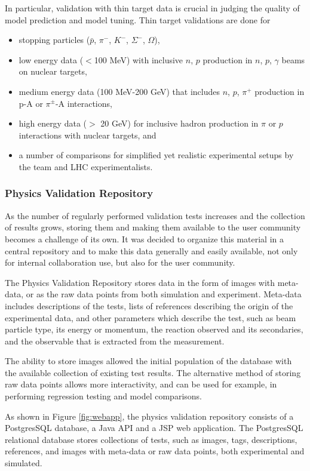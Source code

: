 In particular, validation with thin target data is crucial in judging the 
quality of model prediction and model tuning.  Thin target validations are done
for
\begin{itemize}
\item stopping particles ($\bar{p}$, $\pi^-$, $K^{-}$, $\Sigma^{-}$, $\Omega$),
\item low energy data ($<$100 MeV) with inclusive $n$, $p$ production in $n$,
      $p$, $\gamma$ beams on nuclear targets,
\item medium energy data (100 MeV-200 GeV) that includes $n$, $p$, $\pi^+$ 
      production in p-A or $\pi^{\pm}$-A interactions,
\item high energy data ($>$ 20 GeV) for inclusive hadron production in $\pi$ or
      $p$ interactions with nuclear targets, and
\item a number of comparisons for simplified yet realistic experimental setups
      by the \Gfour{} team and LHC experimentalists.
\end{itemize}

\subsubsection{Physics Validation Repository}
As the number of regularly performed validation tests increases and the 
collection of results grows, storing them and making them available to the 
user community becomes a challenge of its own.  It was decided to organize
this material in a central repository and to make this data generally and easily
available, not only for internal collaboration use, but also for the user 
community.

The Physics Validation Repository stores data in the form of images with 
meta-data, or as the raw data points from both simulation and experiment.
Meta-data includes descriptions of the tests, lists of references describing the
origin of the experimental data, and other parameters which describe the test,
such as beam particle type, its energy or momentum, the reaction observed and 
its secondaries, and the observable that is extracted from the measurement. 

The ability to store images allowed the initial population of the database with
the available collection of existing test results.  The alternative method of 
storing raw data points allows more interactivity, and can be used for example,
in performing regression testing and model comparisons.

As shown in Figure \ref{fig:webapp}, the physics validation repository consists
of a PostgresSQL database, a Java API and a JSP web application. 
The PostgresSQL \cite{PVT:postgres} relational database stores collections of 
tests, such as images, tags, descriptions, references, and images with meta-data
or raw data points, both experimental and simulated.

